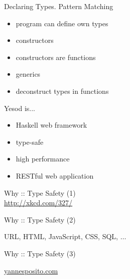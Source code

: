 \documentclass{beamer}
\begin{document}
\begin{frame}{Declaring Types. Pattern Matching}
  \begin{itemize}[<+->]
    \item program can define own types
    \item constructors
    \item constructors are functions
    \item generics
    \item deconstruct types in functions
  \end{itemize}
  \pause
  
  \pause
  
\end{frame}

\begin{frame}{Yesod is...}
  \begin{itemize}[<+->]
    \item Haskell web framework
    \item type-safe
    \item high performance
    \item RESTful web application
  \end{itemize}
  \vspace{-3cm}
  \hspace{6cm}
\end{frame}

\begin{frame}{Why :: Type Safety (1)}
  \\
  \url{http://xkcd.com/327/}
\end{frame}

\begin{frame}{Why :: Type Safety (2)}
  \begin{center}
  \end{center}
    URL, HTML, JavaScript, CSS, SQL, $\ldots$
\end{frame}

\begin{frame}{Why :: Type Safety (3)}
  \begin{center}
  \end{center}
  \href{http://yannesposito.com/Scratch/en/blog/Yesod-tutorial-for-newbies/}{yannesposito.com}
\end{frame}
\end{document}
